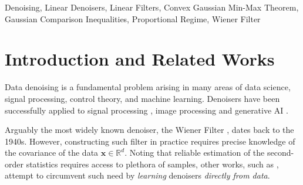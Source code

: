 \documentclass[final]{l4dc2026}
\newcommand{\bSigma}{\bm{\Sigma}}
\newcommand{\bW}{\mathbf{W}}
\newcommand{\bx}{\mathbf{x}}
\newcommand{\bz}{\mathbf{z}}
\newcommand{\hbx}{\hat{\mathbf{x}}}
\newcommand{\bbR}{\mathbb{R}}
\begin{document}
\begin{abstract}
\end{abstract}

\begin{keywords}%
  Denoising, Linear Denoisers, Linear Filters, Convex Gaussian Min-Max Theorem, Gaussian Comparison Inequalities, Proportional Regime, Wiener Filter
\end{keywords}



\section{Introduction and Related Works}


Data denoising is a fundamental problem arising in many areas of data science, signal processing, control theory, and machine learning. Denoisers have been successfully applied to signal processing \citep{kailath2001linear}, image processing \citep{hirakawa2006image, zhang2017beyond, zamir2022restormer} and generative AI \citep{ songscore, song2019generative} .

Arguably the most widely known denoiser, the Wiener Filter \citep{wiener1964extrapolation, kolmogorov1941stationary}, dates back to the 1940s. However, constructing such filter in practice requires precise knowledge of the covariance of the data $\bx \in \bbR^d$. Noting that reliable estimation of the second-order statistics requires access to plethora of samples, other works, such as \cite{hirakawa2006image}, attempt to circumvent such need by {\it learning} denoisers {\it directly from data}. 
\end{document}
